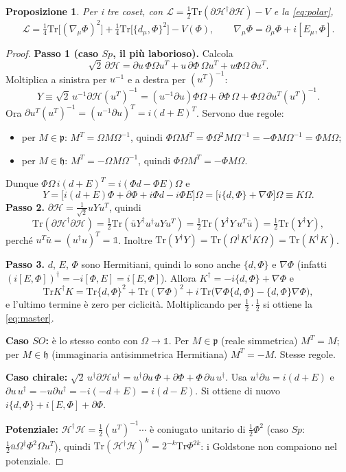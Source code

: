 \documentclass[11pt,a4paper]{article}
\numberwithin{equation}{section}
\newtheorem{prop}{Proposizione}
\theoremstyle{remark}
\newcommand{\Tr}{\mathrm{Tr}}
\newcommand{\Hf}{\mathcal{H}}
\newcommand{\p}{\mathfrak{p}}
\newcommand{\h}{\mathfrak{h}}
\newcommand{\one}{\mathbb{1}}
\begin{document}
\begin{prop}
Per i tre coset, con $\mathcal L=\frac12\Tr(\partial\Hf^\dagger\partial\Hf)-V$ e la \eqref{eq:polar},
\begin{equation}
\boxed{\;\mathcal L=\tfrac14\Tr\big[(\nabla_\mu\Phi)^2\big]+\tfrac14\Tr\big[\{d_\mu,\Phi\}^2\big]-V(\Phi),\qquad\nabla_\mu\Phi=\partial_\mu\Phi+i[E_\mu,\Phi].\;}
\label{eq:master}
\end{equation}
\end{prop}
\begin{proof}
\textbf{Passo 1 (caso $Sp$, il più laborioso).} Calcola
\[
\sqrt2\,\partial\Hf=\partial u\,\Phi\Omega u^T+u\,\partial\Phi\,\Omega u^T+u\Phi\Omega\,\partial u^T .
\]
Moltiplica a sinistra per $u^{-1}$ e a destra per $(u^T)^{-1}$:
\[
Y\equiv\sqrt2\,u^{-1}\partial\Hf(u^T)^{-1}=(u^{-1}\partial u)\Phi\Omega+\partial\Phi\,\Omega+\Phi\Omega\,\partial u^T(u^T)^{-1}.
\]
Ora $\partial u^T(u^T)^{-1}=(u^{-1}\partial u)^T=i(d+E)^T$. Servono due regole:
\begin{itemize}
\item per $M\in\p$: $M^T=\Omega M\Omega^{-1}$, quindi $\Phi\Omega M^T=\Phi\Omega^2M\Omega^{-1}=-\Phi M\Omega^{-1}=\Phi M\Omega$;
\item per $M\in\h$: $M^T=-\Omega M\Omega^{-1}$, quindi $\Phi\Omega M^T=-\Phi M\Omega$.
\end{itemize}
Dunque $\Phi\Omega\,i(d+E)^T=i(\Phi d-\Phi E)\Omega$ e
\[
Y=\big[i(d+E)\Phi+\partial\Phi+i\Phi d-i\Phi E\big]\Omega=\big[i\{d,\Phi\}+\nabla\Phi\big]\Omega\equiv K\Omega .
\]
\textbf{Passo 2.} $\partial\Hf=\frac{1}{\sqrt2}uYu^T$, quindi
\[
\Tr(\partial\Hf^\dagger\partial\Hf)=\tfrac12\Tr(\bar uY^\dagger u^\dagger uYu^T)=\tfrac12\Tr(Y^\dagger Y\,u^T\bar u)=\tfrac12\Tr(Y^\dagger Y),
\]
perché $u^T\bar u=(u^\dagger u)^T=\one$. Inoltre $\Tr(Y^\dagger Y)=\Tr(\Omega^\dagger K^\dagger K\Omega)=\Tr(K^\dagger K)$.

\textbf{Passo 3.} $d$, $E$, $\Phi$ sono Hermitiani, quindi lo sono anche $\{d,\Phi\}$ e $\nabla\Phi$ (infatti $(i[E,\Phi])^\dagger=-i[\Phi,E]=i[E,\Phi]$). Allora $K^\dagger=-i\{d,\Phi\}+\nabla\Phi$ e
\[
\Tr K^\dagger K=\Tr\{d,\Phi\}^2+\Tr(\nabla\Phi)^2+i\,\Tr\big(\nabla\Phi\{d,\Phi\}-\{d,\Phi\}\nabla\Phi\big),
\]
e l'ultimo termine è zero per ciclicità. Moltiplicando per $\frac12\cdot\frac12$ si ottiene la \eqref{eq:master}.

\textbf{Caso $SO$:} è lo stesso conto con $\Omega\to\one$. Per $M\in\p$ (reale simmetrica) $M^T=M$; per $M\in\h$ (immaginaria antisimmetrica Hermitiana) $M^T=-M$. Stesse regole.

\textbf{Caso chirale:} $\sqrt2\,u^\dagger\partial\Hf u^\dagger=u^\dagger\partial u\,\Phi+\partial\Phi+\Phi\,\partial u\,u^\dagger$. Usa $u^\dagger\partial u=i(d+E)$ e $\partial u\,u^\dagger=-u\partial u^\dagger=-i(-d+E)=i(d-E)$. Si ottiene di nuovo $i\{d,\Phi\}+i[E,\Phi]+\partial\Phi$.

\textbf{Potenziale:} $\Hf^\dagger\Hf=\frac12(u^T)^{-1}\cdots$ è coniugato unitario di $\frac12\Phi^2$ (caso $Sp$: $\frac12\bar u\Omega^\dagger\Phi^2\Omega u^T$), quindi $\Tr(\Hf^\dagger\Hf)^k=2^{-k}\Tr\Phi^{2k}$: i Goldstone non compaiono nel potenziale. \qedhere
\end{proof}
\end{document}
